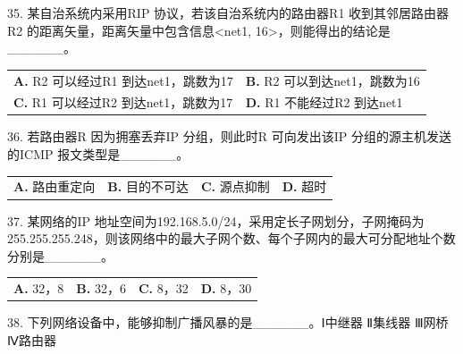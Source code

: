 \documentclass[UTF8,11pt]{ctexart}
\begin{document}
35. 某自治系统内采用RIP 协议，若该自治系统内的路由器R1 收到其邻居路由器R2 的距离矢量，距离矢量中包含信息<net1, 16>，则能得出的结论是\_\_\_\_\_\_。


\begin{center}\begin{tabular}{>{\raggedright\arraybackslash}p{\dimexpr(\linewidth-4\tabcolsep)/2\relax}>{\raggedright\arraybackslash}p{\dimexpr(\linewidth-4\tabcolsep)/2\relax}}
\textbf{A.} R2 可以经过R1 到达net1，跳数为17 & \textbf{B.} R2 可以到达net1，跳数为16\\[.35em]
\textbf{C.} R1 可以经过R2 到达net1，跳数为17 & \textbf{D.} R1 不能经过R2 到达net1\\[.35em]\end{tabular}\end{center}

36. 若路由器R 因为拥塞丢弃IP 分组，则此时R 可向发出该IP 分组的源主机发送的ICMP 报文类型是\_\_\_\_\_\_。


\begin{center}\begin{tabular}{>{\raggedright\arraybackslash}p{\dimexpr(\linewidth-8\tabcolsep)/4\relax}>{\raggedright\arraybackslash}p{\dimexpr(\linewidth-8\tabcolsep)/4\relax}>{\raggedright\arraybackslash}p{\dimexpr(\linewidth-8\tabcolsep)/4\relax}>{\raggedright\arraybackslash}p{\dimexpr(\linewidth-8\tabcolsep)/4\relax}}
\textbf{A.} 路由重定向 & \textbf{B.} 目的不可达 & \textbf{C.} 源点抑制 & \textbf{D.} 超时\\[.35em]\end{tabular}\end{center}

37. 某网络的IP 地址空间为192.168.5.0/24，采用定长子网划分，子网掩码为255.255.255.248，则该网络中的最大子网个数、每个子网内的最大可分配地址个数分别是\_\_\_\_\_\_。


\begin{center}\begin{tabular}{>{\raggedright\arraybackslash}p{\dimexpr(\linewidth-8\tabcolsep)/4\relax}>{\raggedright\arraybackslash}p{\dimexpr(\linewidth-8\tabcolsep)/4\relax}>{\raggedright\arraybackslash}p{\dimexpr(\linewidth-8\tabcolsep)/4\relax}>{\raggedright\arraybackslash}p{\dimexpr(\linewidth-8\tabcolsep)/4\relax}}
\textbf{A.} 32，8 & \textbf{B.} 32，6 & \textbf{C.} 8，32 & \textbf{D.} 8，30\\[.35em]\end{tabular}\end{center}

38. 下列网络设备中，能够抑制广播风暴的是\_\_\_\_\_\_。Ⅰ中继器 Ⅱ集线器 Ⅲ网桥 Ⅳ路由器
\end{document}

